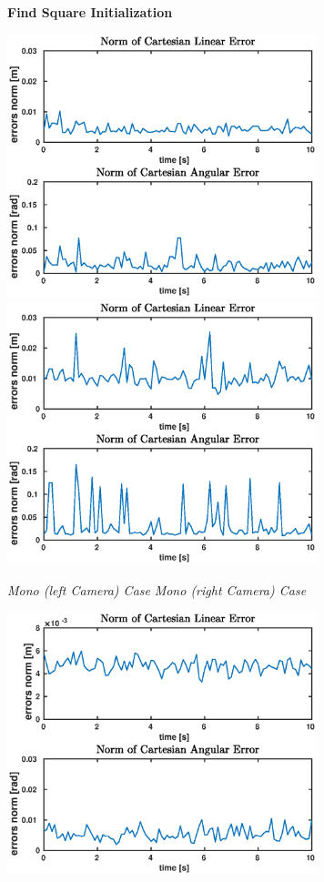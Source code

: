 \begin{figure}
	\centering
	\textbf{Find Square Initialization}\\
	\vspace*{20px}
	\centerline{
		\includegraphics[width=9cm]{tracking/square-mono-left.eps}
		\includegraphics[width=9cm]{tracking/square-mono-right.eps}
	}
	\hspace*{15px}\textit{Mono (left Camera) Case} \hspace{125px} \textit{Mono (right Camera) Case}\\
	\vspace{30px}
	\centerline{
		\includegraphics[width=9cm]{tracking/square-stereo.eps}
}
\end{figure}

